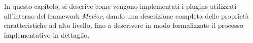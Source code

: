 In questo capitolo, si descrive come vengono implementati i plugins utilizzati all'interno del framework \emph{Metior},
dando una descrizione completa delle proprietà caratteristiche ad alto livello, fino a descrivere in modo formalizzato
il processo implementativo in dettaglio.

